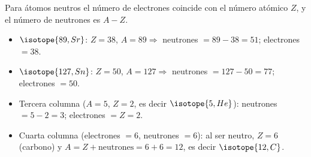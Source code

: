 \begin{exerciseEVAU}
    \begin{solu}
        Para átomos neutros el número de electrones coincide con el número atómico \(Z\), y el número de neutrones es \(A - Z\).
        \begin{itemize}
            \item \(\isotope{89,Sr}\): \(Z=38\), \(A=89 \Rightarrow\) neutrones \(=89-38=51\); electrones \(=38\).
            \item \(\isotope{127,Sn}\): \(Z=50\), \(A=127 \Rightarrow\) neutrones \(=127-50=77\); electrones \(=50\).
            \item Tercera columna (\(A=5\), \(Z=2\), es decir \(\isotope{5,He}\)): neutrones \(=5-2=3\); electrones \(=Z=2\).
            \item Cuarta columna (electrones \(=6\), neutrones \(=6\)): al ser neutro, \(Z=6\) (carbono) y \(A=Z+\text{neutrones}=6+6=12\), es decir \(\isotope{12,C}\).
        \end{itemize}
    \end{solu}
\end{exerciseEVAU}

